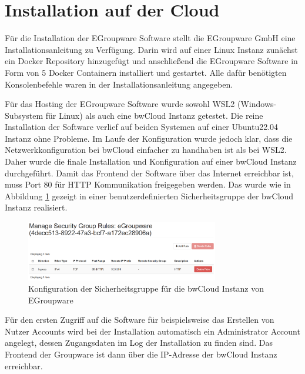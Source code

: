 \section{Installation auf der Cloud}

Für die Installation der EGroupware Software stellt die EGroupware GmbH eine Installationsanleitung zu Verfügung.
Darin wird auf einer Linux Instanz zunächst ein Docker Repository hinzugefügt und anschließend die EGroupware Software in Form von 5 Docker Containern installiert und gestartet.
Alle dafür benötigten Konsolenbefehle waren in der Installationsanleitung angegeben. \autocite{egroupware-installation}

Für das Hosting der EGroupware Software wurde sowohl WSL2 (Windows-Subsystem für Linux) als auch eine bwCloud Instanz getestet.
Die reine Installation der Software verlief auf beiden Systemen auf einer Ubuntu22.04 Instanz ohne Probleme.
Im Laufe der Konfiguration wurde jedoch klar, dass die Netzwerkkonfiguration bei bwCloud einfacher zu handhaben ist als bei WSL2.
Daher wurde die finale Installation und Konfiguration auf einer bwCloud Instanz durchgeführt.
Damit das Frontend der Software über das Internet erreichbar ist, muss Port 80 für HTTP Kommunikation freigegeben werden.
Das wurde wie in Abbildung \ref{fig:bwcloud_security_group} gezeigt in einer benutzerdefinierten Sicherheitsgruppe der bwCloud Instanz realisiert.
\begin{figure}[H]
    \centering
    \includegraphics[width=0.75\textwidth]{images/bwCloud_SecurityGroup.png}
    \caption{Konfiguration der Sicherheitsgruppe für die bwCloud Instanz von EGroupware}
    \label{fig:bwcloud_security_group}
\end{figure}

Für den ersten Zugriff auf die Software für beispielsweise das Erstellen von Nutzer Accounts wird bei der Installation automatisch ein Administrator Account angelegt, dessen Zugangsdaten im Log der Installation zu finden sind.
Das Frontend der Groupware ist dann über die IP-Adresse der bwCloud Instanz erreichbar.